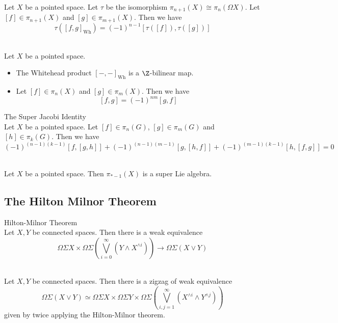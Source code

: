 \documentclass[a4paper]{article}
\begin{document}
\begin{prp}{}{}\\
Let $X$ be a pointed space. Let $\tau$ be the isomorphism $\pi_{n+1}(X)\cong\pi_n(\Omega X)$. Let $[f]\in\pi_{n+1}(X)$ and $[g]\in\pi_{m+1}(X)$. Then we have $$\tau([f,g]_\text{Wh})=(-1)^{n-1}[\tau([f]),\tau([g])]$$
\end{prp}

\begin{prp}{}{}\\
Let $X$ be a pointed space. 
\begin{itemize}
\item The Whitehead product $[-,-]_\text{Wh}$ is a $\Z$-bilinear map. 
\item Let $[f]\in\pi_n(X)$ and $[g]\in\pi_m(X)$. Then we have $$[f,g]=(-1)^{nm}[g,f]$$
\end{itemize}
\end{prp}

\begin{prp}{The Super Jacobi Identity}{}\\
Let $X$ be a pointed space. Let $[f]\in\pi_n(G)$, $[g]\in\pi_m(G)$ and $[h]\in\pi_k(G)$. Then we have $$(-1)^{(n-1)(k-1)}[f,[g,h]]+(-1)^{(n-1)(m-1)}[g,[h,f]]+(-1)^{(m-1)(k-1)}[h,[f,g]]=0$$
\end{prp}

\begin{crl}{}{}\\
Let $X$ be a pointed space. Then $\pi_{\ast-1}(X)$ is a super Lie algebra. 
\end{crl}

\subsection{The Hilton Milnor Theorem}
\begin{thm}{Hilton-Milnor Theorem}{}\\
Let $X,Y$ be connected spaces. Then there is a weak equivalence $$\Omega\Sigma X\times\Omega\Sigma\left(\bigvee_{i=0}^\infty(Y\wedge X^{\wedge i})\right)\to\Omega\Sigma(X\vee Y)$$
\end{thm}

\begin{crl}{}{}\\
Let $X,Y$ be connected spaces. Then there is a zigzag of weak equivalence $$\Omega\Sigma(X\vee Y)\simeq\Omega\Sigma X\times\Omega\Sigma Y\times\Omega\Sigma\left(\bigvee_{i,j=1}^\infty(X^{\wedge i}\wedge Y^{\wedge j})\right)$$ given by twice applying the Hilton-Milnor theorem. 
\end{crl}
\end{document}
